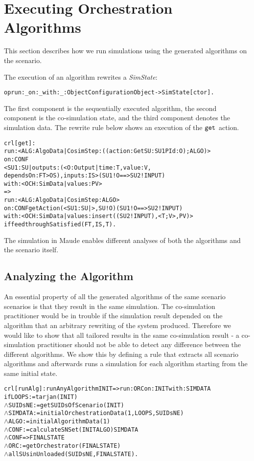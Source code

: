 
\section{Executing Orchestration Algorithms}
This section describes how we run simulations using the generated algorithms on the scenario.

The execution of an algorithm rewrites a \emph{SimState}:
\begin{alltt}
\small
op run:_on:_with:_ : Object Configuration Object -> SimState [ctor]. 
\end{alltt}
The first component is the sequentially executed algorithm, the second component is the co-simulation state, and the third component denotes the simulation data.
The rewrite rule below shows an execution of the $\mathtt{get}_{}$ action.

\begin{alltt}
\small
crl [get] : 
run: < ALG : AlgoData | CosimStep : ((action: Get SU: SU1 PId: O) ; ALGO) >
on: CONF
< SU1 : SU | outputs : (< O : Output | time : T, value : V, 
  dependsOn : FT > OS), inputs : IS > ( SU1 ! O ==> SU2 ! INPUT)
with: < OCH : SimData | values : PV >
=> 
run: < ALG : AlgoData | CosimStep : ALGO >
on: CONF getAction(< SU1 : SU | >, SU ! O) ( SU1 ! O ==> SU2 ! INPUT)
with: < OCH : SimData | values : insert((SU2 ! INPUT), < T ; V >, PV) > 
if feedthroughSatisfied(FT, IS, T) .
\end{alltt}

The simulation in Maude enables different analyses of both the algorithms and the scenario itself.

\subsection{Analyzing the Algorithm}
An essential property of all the generated algorithms of the same scenario scenarios is that they result in the same simulation.
The co-simulation practitioner would be in trouble if the simulation result depended on the algorithm that an arbitrary rewriting of the system produced.
Therefore we would like to show that all tailored results in the same co-simulation result - a co-simulation practitioner should not be able to detect any difference between the different algorithms.
We show this by defining a rule that extracts all scenario algorithms and afterwards runs a simulation for each algorithm starting from the same initial state.

\begin{alltt}
  \small
crl [runAlg] : runAnyAlgorithm INIT => run: ORC on: INIT with: SIMDATA
  if LOOPS := tarjan(INIT)
  \(\land\) SUIDsNE := getSUIDsOfScenario(INIT)
  \(\land\) SIMDATA := initialOrchestrationData(1,LOOPS,SUIDsNE)
  \(\land\) ALGO := initialAlgorithmData(1)
  \(\land\) CONF := calculateSNSet(INIT ALGO) SIMDATA 
  \(\land\) {CONF} => { FINALSTATE } 
  \(\land\) ORC := getOrchestrator(FINALSTATE)
  \(\land\) allSUsinUnloaded(SUIDsNE, FINALSTATE) .
\end{alltt}

